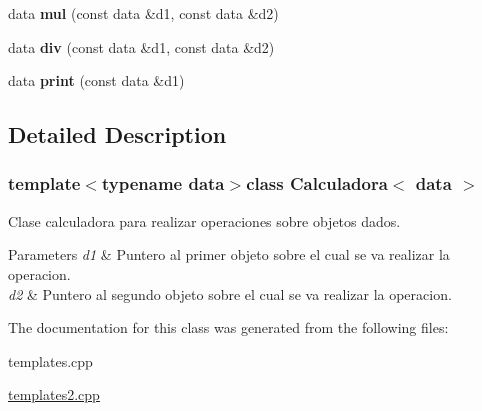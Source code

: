 \begin{DoxyCompactItemize}
\item 
\hypertarget{classCalculadora_a8405bf64afad4435c29975ce6bc74189}{data {\bfseries mul} (const data \&d1, const data \&d2)}\label{classCalculadora_a8405bf64afad4435c29975ce6bc74189}

\item 
\hypertarget{classCalculadora_ae8e459b7a229cbeeb72ff783c2928caa}{data {\bfseries div} (const data \&d1, const data \&d2)}\label{classCalculadora_ae8e459b7a229cbeeb72ff783c2928caa}

\item 
\hypertarget{classCalculadora_a05ea419a0e82aa47a0450ae05717f9e5}{data {\bfseries print} (const data \&d1)}\label{classCalculadora_a05ea419a0e82aa47a0450ae05717f9e5}

\end{DoxyCompactItemize}


\subsection{Detailed Description}
\subsubsection*{template$<$typename data$>$class Calculadora$<$ data $>$}

Clase calculadora para realizar operaciones sobre objetos dados. 


\begin{DoxyParams}{Parameters}
{\em d1} & Puntero al primer objeto sobre el cual se va realizar la operacion. \\
\hline
{\em d2} & Puntero al segundo objeto sobre el cual se va realizar la operacion. \\
\hline
\end{DoxyParams}


The documentation for this class was generated from the following files\-:\begin{DoxyCompactItemize}
\item 
templates.\-cpp\item 
\hyperlink{templates2_8cpp}{templates2.\-cpp}\end{DoxyCompactItemize}
